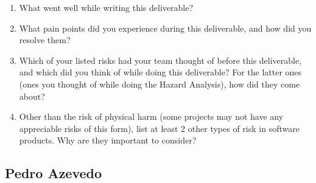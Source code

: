 \documentclass{article}
\begin{document}


\begin{enumerate}
    \item What went well while writing this deliverable? 
    \item What pain points did you experience during this deliverable, and how
    did you resolve them?
    \item Which of your listed risks had your team thought of before this
    deliverable, and which did you think of while doing this deliverable? For
    the latter ones (ones you thought of while doing the Hazard Analysis), how
    did they come about?
    \item Other than the risk of physical harm (some projects may not have any
    appreciable risks of this form), list at least 2 other types of risk in
    software products. Why are they important to consider?
\end{enumerate}

\subsection*{Pedro Azevedo}
\end{document}

